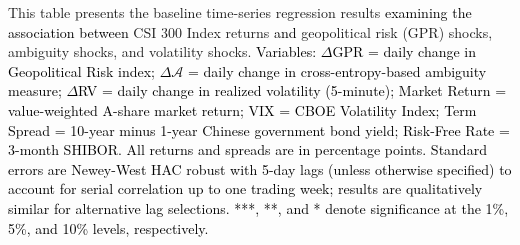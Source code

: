 \documentclass[preprint,12pt,authoryear]{elsarticle}
\begin{document}
\begin{table}[htbp]
\begin{threeparttable}
\begin{tablenotes}[flushleft]
\item[] This table presents the baseline time-series regression results \textcolor{black}{examining the association between} CSI 300 Index returns \textcolor{black}{and} geopolitical risk (GPR) shocks, ambiguity shocks, and volatility shocks. \textcolor{black}{Variables: $\Delta$GPR = daily change in Geopolitical Risk index; $\Delta \mathcal{A}$ = daily change in cross-entropy-based ambiguity measure; $\Delta$RV = daily change in realized volatility (5-minute); Market Return = value-weighted A-share market return; VIX = CBOE Volatility Index; Term Spread = 10-year minus 1-year Chinese government bond yield; Risk-Free Rate = 3-month SHIBOR. All returns and spreads are in percentage points.} \textcolor{black}{Standard errors are Newey-West HAC robust with 5-day lags (unless otherwise specified) to account for serial correlation up to one trading week; results are qualitatively similar for alternative lag selections. ***, **, and * denote significance at the 1\%, 5\%, and 10\% levels, respectively.}
\end{tablenotes}
\end{threeparttable}
\end{table}
\end{document}
